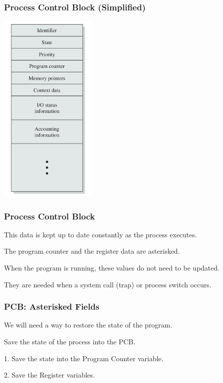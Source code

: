 \begin{frame}
	\frametitle{Process Control Block (Simplified)}

	\begin{center}
		\includegraphics[width=0.35\textwidth]{images/pcb.png}
	\end{center}

\end{frame}

\begin{frame}
	\frametitle{Process Control Block}

	This data is kept up to date constantly as the process executes.

	The program counter and the register data are asterisked.

	When the program is running, these values do not need to be updated.

	They are needed when a system call (trap) or process switch occurs.

\end{frame}

\begin{frame}
	\frametitle{PCB: Asterisked Fields}
	We will need a way to restore the state of the program.

	Save the state of the process into the PCB.

	1. Save the state into the Program Counter variable.

	2. Save the Register variables.

\end{frame}

